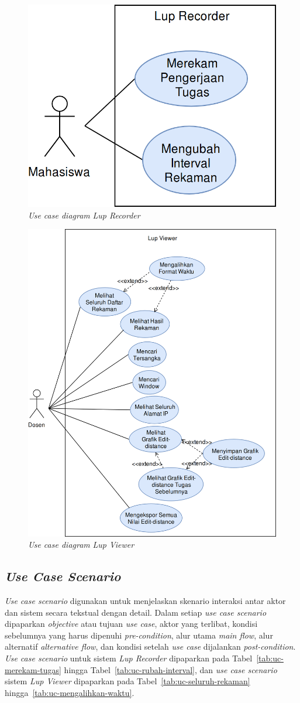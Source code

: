 \begin{figure}[H]
  \centering
  \includegraphics[width=.4\linewidth]{img/use-case/ucd-lupr-v3}
  \caption{\emph{Use case diagram} \emph{Lup Recorder}}\label{fig:ucd-lupr}
\end{figure}

\begin{figure}[H]
  \centering
  \includegraphics[width=.8\linewidth]{img/use-case/ucd-lupv-v3_1}
  \caption{\emph{Use case diagram} \emph{Lup Viewer}}\label{fig:ucd-lupv}
\end{figure}
\newpage %

\subsection{\emph{Use Case Scenario}}


\emph{Use case scenario} digunakan untuk menjelaskan skenario interaksi antar
aktor dan sistem secara tekstual dengan detail. Dalam setiap \emph{use case
  scenario} dipaparkan \emph{objective} atau tujuan \emph{use case},
aktor yang terlibat, kondisi sebelumnya yang harus dipenuhi
\emph{pre-condition}, alur utama \emph{main flow}, alur alternatif
\emph{alternative flow}, dan kondisi setelah \emph{use case}
dijalankan \emph{post-condition}. \emph{Use case scenario} untuk
sistem \emph{Lup Recorder} dipaparkan pada
Tabel~\ref{tab:uc-merekam-tugas} hingga
Tabel~\ref{tab:uc-rubah-interval}, dan \emph{use case scenario} sistem
\emph{Lup Viewer} dipaparkan pada Tabel~\ref{tab:uc-seluruh-rekaman}
hingga~\ref{tab:uc-mengalihkan-waktu}.

